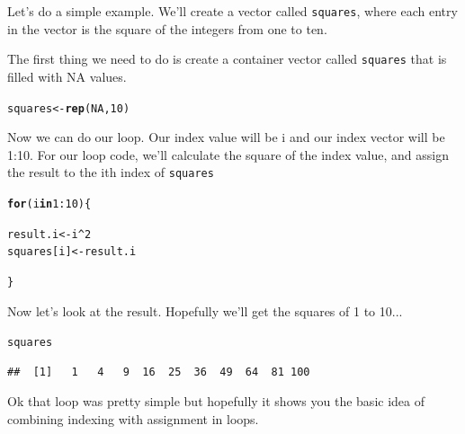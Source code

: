 \documentclass{tufte-book}\usepackage[]{graphicx}\usepackage[]{color}
\makeatletter
\newcommand{\hlnum}[1]{\textcolor[rgb]{0.686,0.059,0.569}{#1}}%
\newcommand{\hlopt}[1]{\textcolor[rgb]{0,0,0}{#1}}%
\newcommand{\hlstd}[1]{\textcolor[rgb]{0.345,0.345,0.345}{#1}}%
\newcommand{\hlkwa}[1]{\textcolor[rgb]{0.161,0.373,0.58}{\textbf{#1}}}%
\newcommand{\hlkwb}[1]{\textcolor[rgb]{0.69,0.353,0.396}{#1}}%
\newcommand{\hlkwd}[1]{\textcolor[rgb]{0.737,0.353,0.396}{\textbf{#1}}}%
\newenvironment{kframe}{%
 \def\at@end@of@kframe{}%
 \ifinner\ifhmode%
  \def\at@end@of@kframe{\end{minipage}}%
  \begin{minipage}{\columnwidth}%
 \fi\fi%
 \def\FrameCommand##1{\hskip\@totalleftmargin \hskip-\fboxsep
 \colorbox{shadecolor}{##1}\hskip-\fboxsep
     \hskip-\linewidth \hskip-\@totalleftmargin \hskip\columnwidth}%
 \MakeFramed {\advance\hsize-\width
   \@totalleftmargin\z@ \linewidth\hsize
   \@setminipage}}%
 {\par\unskip\endMakeFramed%
 \at@end@of@kframe}
\newenvironment{knitrout}{}{} %
\makeatother
\begin{document}
Let's do a simple example. We'll create a vector called \texttt{squares}, where each entry in the vector is the square of the integers from one to ten.

The first thing we need to do is create a container vector called \texttt{squares} that is filled with NA values.

\begin{knitrout}
\color{fgcolor}\begin{kframe}
\begin{alltt}
\hlstd{squares} \hlkwb{<-} \hlkwd{rep}\hlstd{(}\hlnum{NA}\hlstd{,} \hlnum{10}\hlstd{)}
\end{alltt}
\end{kframe}
\end{knitrout}

Now we can do our loop. Our index value will be i and our index vector will be 1:10. For our loop code, we'll calculate the square of the index value, and assign the result to the ith index of \texttt{squares}

\begin{knitrout}
\color{fgcolor}\begin{kframe}
\begin{alltt}
\hlkwa{for}\hlstd{(i} \hlkwa{in} \hlnum{1}\hlopt{:}\hlnum{10}\hlstd{) \{}

  \hlstd{result.i} \hlkwb{<-} \hlstd{i} \hlopt{^} \hlnum{2}
  \hlstd{squares[i]} \hlkwb{<-} \hlstd{result.i}

\hlstd{\}}
\end{alltt}
\end{kframe}
\end{knitrout}

Now let's look at the result. Hopefully we'll get the squares of 1 to 10...

\begin{knitrout}
\color{fgcolor}\begin{kframe}
\begin{alltt}
\hlstd{squares}
\end{alltt}
\begin{verbatim}
##  [1]   1   4   9  16  25  36  49  64  81 100
\end{verbatim}
\end{kframe}
\end{knitrout}


Ok that loop was pretty simple but hopefully it shows you the basic idea of combining indexing with assignment in loops.
\end{document}
